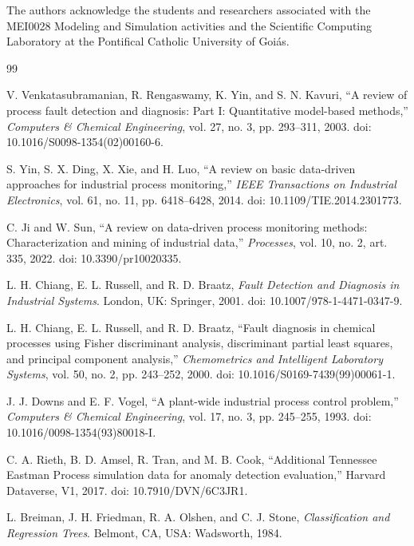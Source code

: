 \documentclass[10pt,twocolumn,a4paper]{article}
\begin{document}
The authors acknowledge the students and researchers associated with the
MEI0028 Modeling and Simulation activities and the Scientific Computing
Laboratory at the Pontifical Catholic University of Goi\'as.

\balance
\begin{thebibliography}{99}

V. Venkatasubramanian, R. Rengaswamy, K. Yin, and S. N. Kavuri,
``A review of process fault detection and diagnosis: Part I: Quantitative
model-based methods,'' \emph{Computers \& Chemical Engineering}, vol. 27,
no. 3, pp. 293--311, 2003. doi: 10.1016/S0098-1354(02)00160-6.

S. Yin, S. X. Ding, X. Xie, and H. Luo,
``A review on basic data-driven approaches for industrial process monitoring,''
\emph{IEEE Transactions on Industrial Electronics}, vol. 61, no. 11,
pp. 6418--6428, 2014. doi: 10.1109/TIE.2014.2301773.

C. Ji and W. Sun,
``A review on data-driven process monitoring methods: Characterization and
mining of industrial data,'' \emph{Processes}, vol. 10, no. 2, art. 335,
2022. doi: 10.3390/pr10020335.

L. H. Chiang, E. L. Russell, and R. D. Braatz,
\emph{Fault Detection and Diagnosis in Industrial Systems}. London, UK:
Springer, 2001. doi: 10.1007/978-1-4471-0347-9.

L. H. Chiang, E. L. Russell, and R. D. Braatz,
``Fault diagnosis in chemical processes using Fisher discriminant analysis,
discriminant partial least squares, and principal component analysis,''
\emph{Chemometrics and Intelligent Laboratory Systems}, vol. 50, no. 2,
pp. 243--252, 2000. doi: 10.1016/S0169-7439(99)00061-1.

J. J. Downs and E. F. Vogel,
``A plant-wide industrial process control problem,''
\emph{Computers \& Chemical Engineering}, vol. 17, no. 3, pp. 245--255,
1993. doi: 10.1016/0098-1354(93)80018-I.

C. A. Rieth, B. D. Amsel, R. Tran, and M. B. Cook,
``Additional Tennessee Eastman Process simulation data for anomaly detection
evaluation,'' Harvard Dataverse, V1, 2017.
doi: 10.7910/DVN/6C3JR1.

L. Breiman, J. H. Friedman, R. A. Olshen, and C. J. Stone,
\emph{Classification and Regression Trees}. Belmont, CA, USA: Wadsworth, 1984.


\end{thebibliography}
\end{document}
